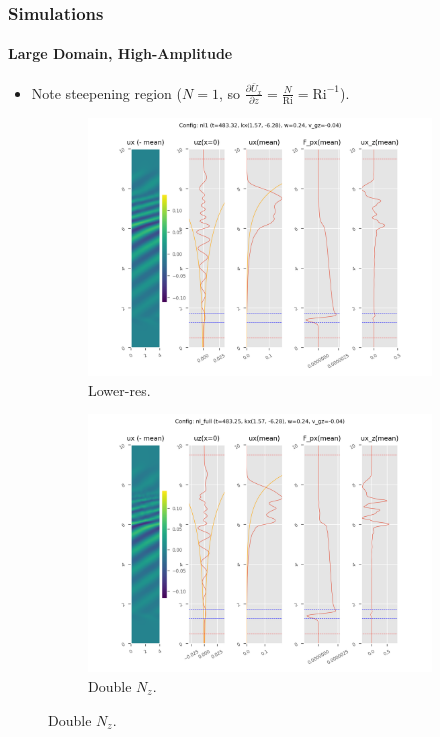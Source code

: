 \documentclass[dvipsnames, 10pt]{beamer}
\newcommand*{\pd}[2]{\frac{\partial#1}{\partial#2}}
\begin{document}
\begin{frame}
    \frametitle{Simulations}
    \framesubtitle{Large Domain, High-Amplitude}

    \begin{itemize}
        \item Note steepening region ($N = 1$, so $\pd{\bar{U}_x}{z} =
            \frac{N}{\mathrm{Ri}} = \mathrm{Ri}^{-1}$).
    \end{itemize}

    \begin{figure}[t]
        \centering
        \hspace*{-19mm}%
        \begin{subfigure}{0.53\textwidth}
            \centering
            \includegraphics[width=\textwidth]{nl_low_1.png}
            \caption{Lower-res.}
        \end{subfigure}
        \begin{subfigure}{0.53\textwidth}
            \centering
            \includegraphics[width=\textwidth]{nl_full_1.png}
            \caption{Double $N_z$.}
        \end{subfigure}
        \hspace*{-19mm}%
    \end{figure}
\end{frame}
\end{document}
